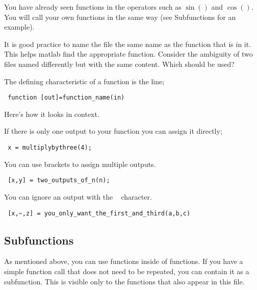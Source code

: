 You have already seen functions in the operators such as $\sin()$ and $\cos()$.
 You will call your own functions in the same way (see Subfunctions for an example).
 
It is good practice to name the file the same name as the function that is in it.
 This helps matlab find the appropriate function.
 Consider the ambiguity of two files named differently but with the same content.
 Which should be used?

The defining characteristic of a function is the line;
\begin{verbatim}
 function [out]=function_name(in)
\end{verbatim}

Here's how it looks in context.
\begin{quote}

\end{quote}

If there is only one output to your function you can assign it directly;
\begin{verbatim}
 x = multiplybythree(4);
\end{verbatim}

You can use brackets to assign multiple outputs.
\begin{verbatim}
 [x,y] = two_outputs_of_n(n);
\end{verbatim}

You can ignore an output with the ~ character.
\begin{verbatim}
 [x,~,z] = you_only_want_the_first_and_third(a,b,c)
\end{verbatim}

\pagebreak
\subsection{Subfunctions}
As mentioned above, you can use functions inside of functions.
 If you have a simple function call that does not need to be repeated, you can contain it as a subfunction.
 This is visible only to the functions that also appear in this file.

\begin{quote}

\end{quote}
